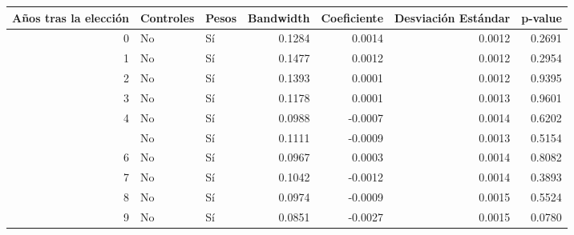 
\begin{tabular}{rllrrrr}
\toprule
Años tras la elección & Controles & Pesos & Bandwidth & Coeficiente & Desviación Estándar & p-value\\
\midrule
0 & No & Sí & 0.1284 & 0.0014 & 0.0012 & 0.2691\\
1 & No & Sí & 0.1477 & 0.0012 & 0.0012 & 0.2954\\
2 & No & Sí & 0.1393 & 0.0001 & 0.0012 & 0.9395\\
3 & No & Sí & 0.1178 & 0.0001 & 0.0013 & 0.9601\\
4 & No & Sí & 0.0988 & -0.0007 & 0.0014 & 0.6202\\
\addlinespace
5 & No & Sí & 0.1111 & -0.0009 & 0.0013 & 0.5154\\
6 & No & Sí & 0.0967 & 0.0003 & 0.0014 & 0.8082\\
7 & No & Sí & 0.1042 & -0.0012 & 0.0014 & 0.3893\\
8 & No & Sí & 0.0974 & -0.0009 & 0.0015 & 0.5524\\
9 & No & Sí & 0.0851 & -0.0027 & 0.0015 & 0.0780\\
\bottomrule
\end{tabular}